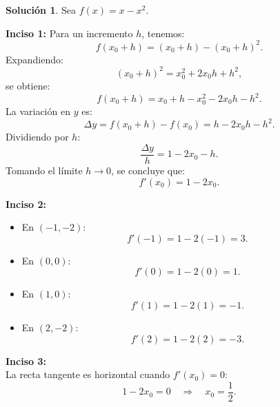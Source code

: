 \documentclass{article}
\theoremstyle{definition}
\newtheorem*{solution}{Solución}
\begin{document}
\begin{solution}
Sea \( f(x)=x-x^2 \).

\medskip

\begin{center}
\end{center}

\textbf{Inciso 1:}
Para un incremento \( h \), tenemos:
\[
f(x_0+h)=(x_0+h)-(x_0+h)^2.
\]
Expandiendo:
\[
(x_0+h)^2=x_0^2+2x_0h+h^2,
\]
se obtiene:
\[
f(x_0+h)=x_0+h-x_0^2-2x_0h-h^2.
\]
La variación en \( y \) es:
\[
\Delta y=f(x_0+h)-f(x_0)=h-2x_0h-h^2.
\]
Dividiendo por \( h \):
\[
\frac{\Delta y}{h}=1-2x_0-h.
\]
Tomando el límite \( h\to 0 \), se concluye que:
\[
f'(x_0)=1-2x_0.
\]

\textbf{Inciso 2:}
\begin{itemize}
    \item En \((-1,-2)\):
    \[
    f'(-1)=1-2(-1)=3.
    \]
    \item En \((0,0)\):
    \[
    f'(0)=1-2(0)=1.
    \]
    \item En \((1,0)\):
    \[
    f'(1)=1-2(1)=-1.
    \]
    \item En \((2,-2)\):
    \[
    f'(2)=1-2(2)=-3.
    \]
\end{itemize}

\textbf{Inciso 3:}\\
La recta tangente es horizontal cuando \( f'(x_0)=0 \):
\[
1-2x_0=0 \quad\Longrightarrow\quad x_0=\frac{1}{2}.
\]
\end{solution}
\end{document}
